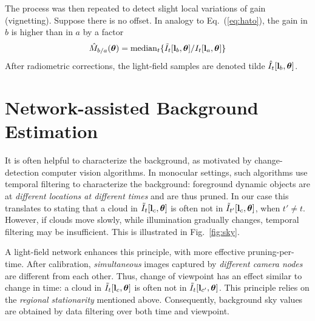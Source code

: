 \documentclass[runningheads]{llncs}
\begin{document}
The process was then repeated to detect slight local variations of gain (vignetting). Suppose there is no offset. In analogy to Eq.~(\ref{eq:hato}), the gain in $b$ is higher than in $a$ by a factor
\begin{equation}
 {\hat M}_{b/a}({\bm \theta})=
  {\rm median}_{t} \{\tilde I_t[{\bf l}_b,{\bm \theta}]/I_t[{\bf l}_a,{\bm \theta}]\}
 \label{eq:hatm}
\end{equation}
After radiometric corrections, the light-field samples are denoted tilde $\hat I_t[{\bf l}_b,{\bm \theta}]$.


\section{Network-assisted Background Estimation}
\label{sec:background}

It is often helpful to characterize the background, as motivated by change-detection computer vision algorithms. In monocular settings, such algorithms use temporal filtering to characterize the background: foreground dynamic objects are at {\em different locations at different times} and are thus pruned. In our case this translates to stating that a cloud in
$\tilde I_t[{\bf l}_c,{\bm \theta}]$ is often not in
$\tilde I_{t'}[{\bf l}_c,{\bm \theta}]$, when $t'\neq t$. However, if clouds move slowly, while illumination gradually changes, temporal filtering may be insufficient. This is illustrated in Fig.~\ref{fig:sky}.

A light-field network enhances this principle, with more effective pruning-per-time. After calibration, {\em simultaneous} images captured by {\em different camera nodes} are different from each other. Thus, change of viewpoint has an effect similar to change in time: a cloud in
$\tilde I_t[{\bf l}_c,{\bm \theta}]$ is often not in $\tilde I_t[{\bf l}_{c'},{\bm \theta}]$. This principle relies on the {\em regional stationarity} mentioned above. Consequently, background sky values are obtained by data filtering over both time and viewpoint.
\end{document}
